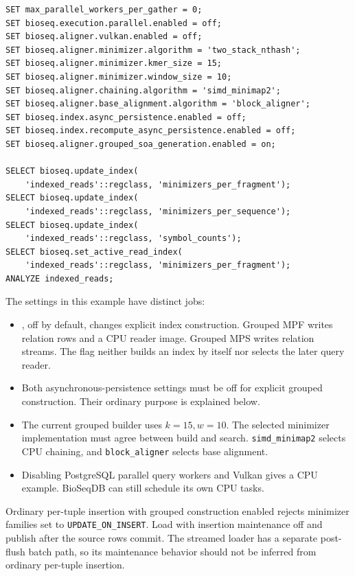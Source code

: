 \par\noindent\begin{minipage}{\linewidth}
\begin{lstlisting}[style=bioseq-appendix-sql,
  caption={Build grouped generations from committed source rows.}]
SET max_parallel_workers_per_gather = 0;
SET bioseq.execution.parallel.enabled = off;
SET bioseq.aligner.vulkan.enabled = off;
SET bioseq.aligner.minimizer.algorithm = 'two_stack_nthash';
SET bioseq.aligner.minimizer.kmer_size = 15;
SET bioseq.aligner.minimizer.window_size = 10;
SET bioseq.aligner.chaining.algorithm = 'simd_minimap2';
SET bioseq.aligner.base_alignment.algorithm = 'block_aligner';
SET bioseq.index.async_persistence.enabled = off;
SET bioseq.index.recompute_async_persistence.enabled = off;
SET bioseq.aligner.grouped_soa_generation.enabled = on;

SELECT bioseq.update_index(
    'indexed_reads'::regclass, 'minimizers_per_fragment');
SELECT bioseq.update_index(
    'indexed_reads'::regclass, 'minimizers_per_sequence');
SELECT bioseq.update_index(
    'indexed_reads'::regclass, 'symbol_counts');
SELECT bioseq.set_active_read_index(
    'indexed_reads'::regclass, 'minimizers_per_fragment');
ANALYZE indexed_reads;
\end{lstlisting}
\end{minipage}

The settings in this example have distinct jobs:
\begin{itemize}
  \item {}, off by
    default, changes explicit index construction. Grouped MPF writes
    relation rows and a CPU reader image. Grouped MPS writes relation
    streams. The flag neither builds an index by itself nor selects the
    later query reader.
  \item Both asynchronous-persistence settings must be off for explicit
    grouped construction. Their ordinary purpose is explained below.
  \item The current grouped builder uses $k=15,w=10$. The selected
    minimizer implementation must agree between build and search.
    \texttt{simd\_minimap2} selects CPU chaining, and
    \texttt{block\_aligner} selects base alignment.
  \item Disabling PostgreSQL parallel query workers and Vulkan gives a
    CPU example. BioSeqDB can still schedule its own CPU tasks.
\end{itemize}

Ordinary per-tuple insertion with grouped construction enabled rejects
minimizer families set to \texttt{UPDATE\_ON\_INSERT}. Load with insertion
maintenance off and publish after the source rows commit. The streamed
loader has a separate post-flush batch path, so its maintenance behavior
should not be inferred from ordinary per-tuple insertion.

